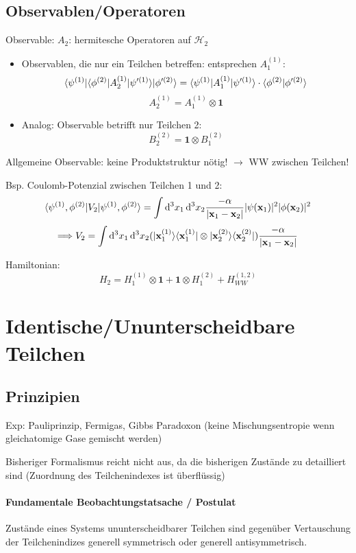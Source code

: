 \documentclass[11pt,a4paper]{report}
\begin{document}
\subsection{Observablen/Operatoren}

Observable: $A_2$: hermitesche Operatoren auf $\mathcal{H}_2$
\begin{itemize}
\item Observablen, die nur ein Teilchen betreffen: entsprechen $A_1^{(1)}$:
$$\langle \psi^{(1)} |\langle \phi^{(2)} | A_2^{(1)} |\psi'^{(1)}\rangle|\phi'^{(2)}\rangle = \langle \psi^{(1)}|A_1^{(1)}|\psi'^{(1)}\rangle\cdot\langle \phi^{(2)} | \phi'^{(2)} \rangle$$
$$A_2^{(1)}=A_1^{(1)}\otimes\mathbf{1}$$
\item Analog: Observable betrifft nur Teilchen 2:
$$B_2^{(2)}=\mathbf{1}\otimes B_1^{(2)}$$
\end{itemize}
Allgemeine Observable: keine Produktstruktur nötig! $\rightarrow$ WW zwischen Teilchen!\par 
Bsp. Coulomb-Potenzial zwischen Teilchen 1 und 2:
$$\langle \psi^{(1)},\phi^{(2)}|V_2|\psi^{(1)},\phi^{(2)}\rangle=\int\mathrm{d}^3x_1\,\mathrm{d}^3x_2\frac{-\alpha}{|\mathbf{x}_1-\mathbf{x}_2|}|\psi (\mathbf{x}_1)|^2 |\phi (\mathbf{x}_2)|^2$$
$$\Longrightarrow V_2 = \int\mathrm{d}^3x_1\,\mathrm{d}^3x_2 (|\mathbf{x}_1^{(1)}\rangle\langle \mathbf{x}_1^{(1)} |\otimes |\mathbf{x}_2^{(2)}\rangle\langle \mathbf{x}_2^{(2)} |)\frac{-\alpha}{|\mathbf{x}_1-\mathbf{x}_2|}$$

Hamiltonian:
$$H_2=H_1^{(1)}\otimes\mathbf{1} + \mathbf{1}\otimes H_1^{(2)}+H_{WW}^{(1,2)}$$

\section{Identische/Ununterscheidbare Teilchen}

\subsection{Prinzipien}

Exp: Pauliprinzip, Fermigas, Gibbs Paradoxon (keine Mischungsentropie wenn gleichatomige Gase gemischt werden)\par 

Bisheriger Formalismus reicht nicht aus, da die bisherigen Zustände zu detailliert sind (Zuordnung des Teilchenindexes ist überflüssig)\par 

\paragraph{Fundamentale Beobachtungstatsache / Postulat} Zustände eines Systems ununterscheidbarer Teilchen sind gegenüber Vertauschung der Teilchenindizes generell symmetrisch oder generell antisymmetrisch.
\end{document}

